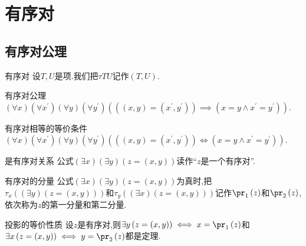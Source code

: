 \chapter{有序对}

\section{有序对公理}

\begin{definition}{有序对}{}
	设$T,U$是项.我们把$\tau TU$记作$\left(T,U\right)$.
\end{definition}

\begin{axiom}{有序对公理}{}
	$\left(\forall x\right)\left(\forall x^{\prime}\right)\left(\forall y\right)\left(\forall y^{\prime}\right)\left(\left(\left(x,y\right)=\left(x^{\prime},y^{\prime}\right)\right)\implies\left(x=y\wedge x^{\prime}=y^{\prime}\right)\right)$.
\end{axiom}

\begin{theorem}{有序对相等的等价条件}{}
	$\left(\forall x\right)\left(\forall x^{\prime}\right)\left(\forall y\right)\left(\forall y^{\prime}\right)\left(\left(\left(x,y\right)=\left(x^{\prime},y^{\prime}\right)\right)\iff\left(x=y\wedge x^{\prime}=y^{\prime}\right)\right)$.
\end{theorem}

\begin{definition}{是有序对关系}{}
	公式$\left(\exists x\right)\left(\exists y\right)\left(z=\left(x,y\right)\right)$读作``$z$是一个有序对''.
\end{definition}

\begin{definition}{有序对的分量}{}
	公式$\left(\exists x\right)\left(\exists y\right)\left(z=\left(x,y\right)\right)$为真时,把$\tau_{x}\left(\left(\exists y\right)\left(z=\left(x,y\right)\right)\right)$和$\tau_{y}\left(\left(\exists x\right)\left(z=\left(x,y\right)\right)\right)$记作$\pr_{1}\left(z\right)$和$\pr_{2}\left(z\right)$,依次称为$z$的第一分量和第二分量.
\end{definition}

\begin{proposition}{投影的等价性质}{}
	设$z$是有序对,则$\exists y\left(z=\left(x,y\right)\right)\iff x=\pr_{1}\left(z\right)$和$\exists x\left(z=\left(x,y\right)\right)\iff y=\pr_{2}\left(z\right)$都是定理.
\end{proposition}

